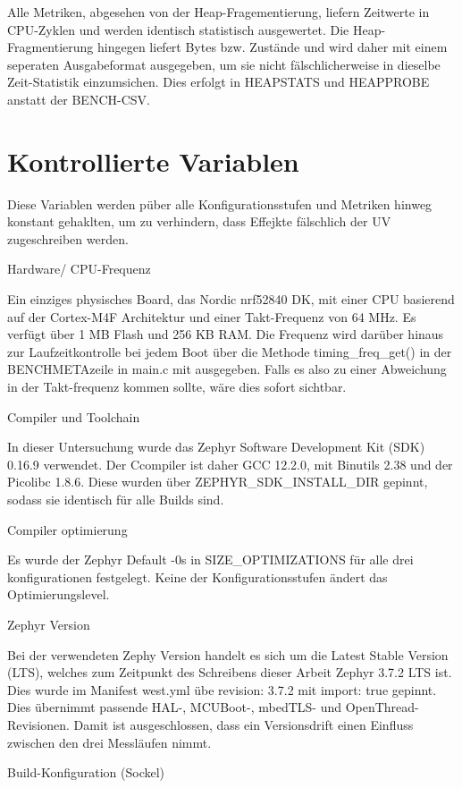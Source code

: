 Alle Metriken, abgesehen von der Heap-Fragementierung, liefern Zeitwerte in CPU-Zyklen und werden identisch statistisch ausgewertet. Die Heap-Fragmentierung hingegen liefert Bytes bzw. Zustände und wird daher mit einem seperaten Ausgabeformat ausgegeben, um sie nicht fälschlicherweise in dieselbe Zeit-Statistik einzumsichen. Dies erfolgt in HEAPSTATS und HEAPPROBE anstatt der BENCH-CSV.

\section{Kontrollierte Variablen}

Diese Variablen werden püber alle Konfigurationsstufen und Metriken hinweg konstant gehaklten, um zu verhindern, dass Effejkte fälschlich der UV zugeschreiben werden.

Hardware/ CPU-Frequenz

Ein einziges physisches Board, das Nordic nrf52840 DK, mit einer CPU basierend auf der Cortex-M4F Architektur und einer Takt-Frequenz von 64 MHz. Es verfügt über 1 MB Flash und 256 KB RAM. Die Frequenz wird darüber hinaus zur Laufzeitkontrolle bei jedem Boot über die Methode timing\_freq\_get() in der BENCHMETAzeile in main.c mit ausgegeben. Falls es also zu einer Abweichung in der Takt-frequenz kommen sollte, wäre dies sofort sichtbar.

Compiler und Toolchain

In dieser Untersuchung wurde das Zephyr Software Development Kit (SDK) 0.16.9 verwendet. Der Ccompiler ist daher GCC 12.2.0, mit Binutils 2.38 und der Picolibc 1.8.6. Diese wurden über ZEPHYR\_SDK\_INSTALL\_DIR gepinnt, sodass sie identisch für alle Builds sind.

Compiler optimierung

Es wurde der Zephyr Default -0s in SIZE\_OPTIMIZATIONS für alle drei konfigurationen festgelegt. Keine der Konfigurationsstufen ändert das Optimierungslevel.

Zephyr Version

Bei der verwendeten Zephy Version handelt es sich um die Latest Stable Version (LTS), welches zum Zeitpunkt des Schreibens dieser Arbeit Zephyr 3.7.2 LTS ist. Dies wurde im Manifest west.yml übe revision: 3.7.2 mit import: true gepinnt. Dies übernimmt passende HAL-, MCUBoot-, mbedTLS- und OpenThread-Revisionen. Damit ist ausgeschlossen, dass ein Versionsdrift einen Einfluss zwischen den drei Messläufen nimmt.

Build-Konfiguration (Sockel)

